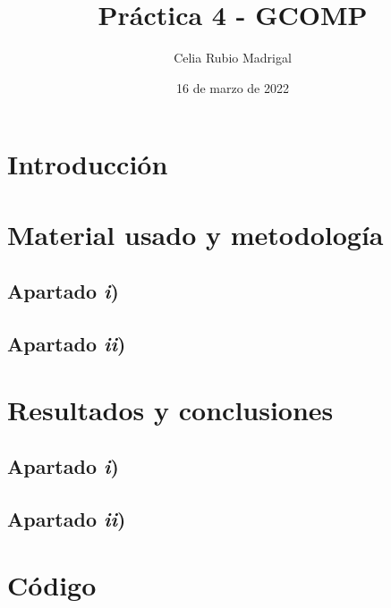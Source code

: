\documentclass[a4paper]{article}
\author{Celia Rubio Madrigal}
\title{Práctica 4 - GCOMP}
\date{16 de marzo de 2022}
\begin{document}
	\maketitle
	
	\tableofcontents
	
	\vfill
	
	\begin{center}
	\end{center}
	
	
	\vfill
	\newpage
	
	\section{Introducción}
	
	\section{Material usado y metodología}
	
	
	\subsection{Apartado \textit{i})}
	
	
	\subsection{Apartado \textit{ii})}
	
	\section{Resultados y conclusiones}
	
	
	\subsection{Apartado \textit{i})}
	
	
	\subsection{Apartado \textit{ii})}
	
	\newpage
	\section{Código}\label{codigo}
	
	
	
\end{document}
